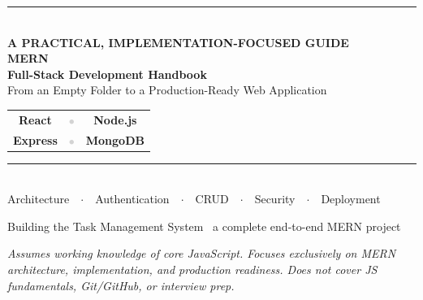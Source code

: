 \documentclass[10pt,oneside]{book}
\begin{document}
\begin{titlepage}
\begin{center}
\vspace*{2.2cm}
{\color{mernblue}\rule{\textwidth}{2pt}}\\[1.6cm]
{\headingfont\bfseries\color{lightgray}\Large A PRACTICAL, IMPLEMENTATION-FOCUSED GUIDE}\\[0.8cm]
{\headingfont\bfseries\color{mernblue}\fontsize{40}{48}\selectfont MERN}\\[0.2cm]
{\headingfont\bfseries\color{mernblue}\fontsize{26}{30}\selectfont Full-Stack Development Handbook}\\[1.4cm]
{\headingfont\color{mernteal}\Large From an Empty Folder to a Production-Ready Web Application}\\[2cm]

\begin{tabular}{ccc}
\textcolor{mernblue}{\Large\bfseries React} & \textcolor{lightgray}{\Large $\bullet$} & \textcolor{mernteal}{\Large\bfseries Node.js}\\[4pt]
\textcolor{mernorange}{\Large\bfseries Express} & \textcolor{lightgray}{\Large $\bullet$} & \textcolor{merngreen}{\Large\bfseries MongoDB}
\end{tabular}

\vspace{2.5cm}
{\color{mernblue}\rule{0.5\textwidth}{1pt}}\\[0.6cm]
{\headingfont\color{lightgray} Architecture\ \ $\cdot$\ \ Authentication\ \ $\cdot$\ \ CRUD\ \ $\cdot$\ \ Security\ \ $\cdot$\ \ Deployment}
\end{center}
\vfill
\begin{center}
{\headingfont\color{lightgray}\small Building the Task Management System \textemdash\ a complete end-to-end MERN project}
\end{center}
\vspace*{1.5cm}
\restoregeometry
\end{titlepage}

\clearpage
{}
{\footnotesize
\setlength{\cftbeforechapskip}{1pt}
\setlength{\cftbeforesecskip}{0pt}
\tableofcontents}

\begin{center}
{\headingfont\color{lightgray}\footnotesize\itshape Assumes working knowledge of core JavaScript.
Focuses exclusively on MERN architecture, implementation, and production readiness.
Does not cover JS fundamentals, Git/GitHub, or interview prep.}
\end{center}
\end{document}
